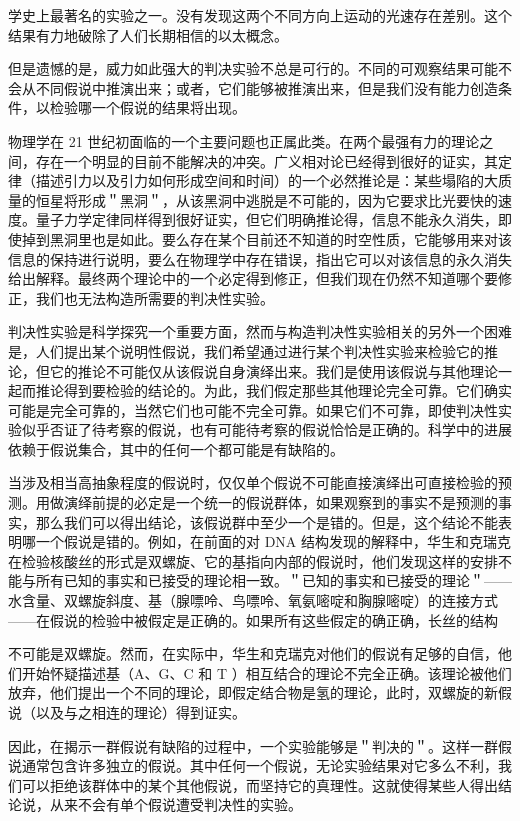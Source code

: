 学史上最著名的实验之一。没有发现这两个不同方向上运动的光速存在差别。这个结果有力地破除了人们长期相信的以太概念。\cite{miller1981}

但是遗憾的是，威力如此强大的判决实验不总是可行的。不同的可观察结果可能不会从不同假说中推演出来；或者，它们能够被推演出来，但是我们没有能力创造条件，以检验哪一个假说的结果将出现。

物理学在 21 世纪初面临的一个主要问题也正属此类。在两个最强有力的理论之间，存在一个明显的目前不能解决的冲突。广义相对论已经得到很好的证实，其定律（描述引力以及引力如何形成空间和时间）的一个必然推论是：某些塌陷的大质量的恒星将形成＂黑洞＂，从该黑洞中逃脱是不可能的，因为它要求比光要快的速度。量子力学定律同样得到很好证实，但它们明确推论得，信息不能永久消失，即使掉到黑洞里也是如此。要么存在某个目前还不知道的时空性质，它能够用来对该信息的保持进行说明，要么在物理学中存在错误，指出它可以对该信息的永久消失给出解释。最终两个理论中的一个必定得到修正，但我们现在仍然不知道哪个要修正，我们也无法构造所需要的判决性实验。\cite{hawking1974}

判决性实验是科学探究一个重要方面，然而与构造判决性实验相关的另外一个困难是，人们提出某个说明性假说，我们希望通过进行某个判决性实验来检验它的推论，但它的推论不可能仅从该假说自身演绎出来。我们是使用该假说与其他理论一起而推论得到要检验的结论的。为此，我们假定那些其他理论完全可靠。它们确实可能是完全可靠的，当然它们也可能不完全可靠。如果它们不可靠，即使判决性实验似乎否证了待考察的假说，也有可能待考察的假说恰恰是正确的。科学中的进展依赖于假说集合，其中的任何一个都可能是有缺陷的。

当涉及相当高抽象程度的假说时，仅仅单个假说不可能直接演绎出可直接检验的预测。用做演绎前提的必定是一个统一的假说群体，如果观察到的事实不是预测的事实，那么我们可以得出结论，该假说群中至少一个是错的。但是，这个结论不能表明哪一个假说是错的。例如，在前面的对 DNA 结构发现的解释中，华生和克瑞克在检验核酸丝的形式是双螺旋、它的基指向内部的假说时，他们发现这样的安排不能与所有已知的事实和已接受的理论相一致。＂已知的事实和已接受的理论＂——水含量、双螺旋斜度、基（腺嘌呤、鸟嘌呤、氧氨嘧啶和胸腺嘧啶）的连接方式——在假说的检验中被假定是正确的。如果所有这些假定的确正确，长丝的结构

不可能是双螺旋。然而，在实际中，华生和克瑞克对他们的假说有足够的自信，他们开始怀疑描述基（A、G、C 和 T ）相互结合的理论不完全正确。该理论被他们放弃，他们提出一个不同的理论，即假定结合物是氢的理论，此时，双螺旋的新假说（以及与之相连的理论）得到证实。

因此，在揭示一群假说有缺陷的过程中，一个实验能够是＂判决的＂。这样一群假说通常包含许多独立的假说。其中任何一个假说，无论实验结果对它多么不利，我们可以拒绝该群体中的某个其他假说，而坚持它的真理性。这就使得某些人得出结论说，从来不会有单个假说遭受判决性的实验。

